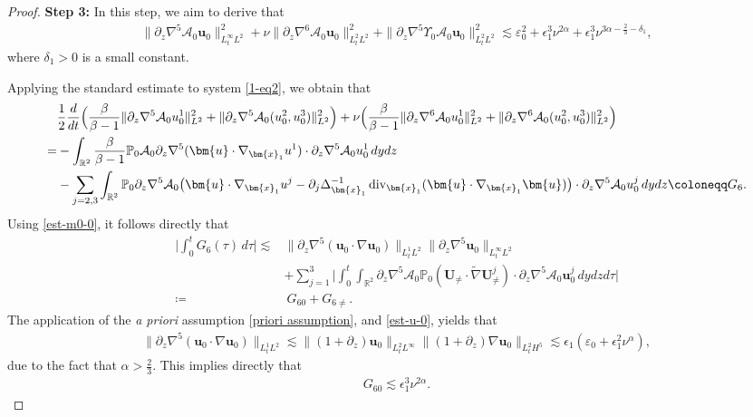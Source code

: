 \documentclass[11pt,reqno]{article}
\numberwithin{equation}{section}
\newcommand\R{{\mathbb R}}
\newcommand\PP{{\mathbb P}}
\newcommand\A{\mathcal{A}}
\newcommand\x{\bm{x}}
\newcommand\uu{\bm{u}}
\newcommand\U{\bm{U}}
\newcommand \tri {\coloneqq}
\let\pa=\partial
\let\na=\nabla
\let\al=\alpha
\let\var=\varepsilon
\let\f=\frac
\let\ep=\epsilon
\def\dive{\mathop{\rm div}\nolimits}
\begin{document}
\begin{proof}
\medskip
\noindent
\textbf{Step 3:} In this step, we aim to derive that
\begin{align}\label{est-step2}
      \|\pa_z\nabla^5\A_0\uu_0\|_{L^\infty_tL^{2}}^2
        +\nu \|\pa_z\nabla^6\A_0\uu_0\|_{L^2_tL^{2}}^2
        +\|\pa_z\nabla^5\varUpsilon_0\A_0\uu_0\|_{L^2_tL^{2}}^2
        \lesssim \var_0^2+\ep_1^3\nu^{2\al}+\ep_1^3\nu^{3\al-\f23-\delta_1},
\end{align}
where $\delta_1>0$ is a small constant.


Applying the standard estimate to system \eqref{1-eq2}, we obtain that
\begin{align}
	&\f12\f{d}{dt}
	\Big(
	\f{\beta}{\beta-1}\|\pa_z\nabla^5\A_0u_0^1\|_{L^2}^2
    +\|\pa_z\nabla^5\A_0(u_0^2,u_0^3)\|_{L^2}^2
	\Big)
	+
	\nu\Big(\f{\beta}{\beta-1}\|\pa_z\nabla^{6}\A_0u_0^1\|_{L^2}^2
    +\|\pa_z\nabla^{6}\A_0(u_0^2,u_0^3)\|_{L^2}^2
	\Big)
	\nonumber\\
	=&-\int_{\R^2}	\f{\beta}{\beta-1}\PP_0\A_0\pa_z\nabla^5(\uu\cdot\nabla_{\x_1} u^1)\cdot \pa_z\nabla^5\A_0u_0^1\,dydz
    \nonumber\\
    &
    -\sum_{j=2,3}\int_{\R^2}\PP_0\pa_z\nabla^5\A_0\big(\uu\cdot\nabla_{\x_1} u^j-\pa_j \Delta_{\x_1}^{-1}\dive_{\x_1}(\uu\cdot\nabla_{\x_1} \uu)\big)\cdot \pa_z\nabla^5\A_0 u_0^j \,dydz
	\tri  G_6.
	\label{energy-0-3}
\end{align}
Using \eqref{est-m0-0}, it follows directly that
\begin{align}\label{est-G6}
    \Big|\int_0^t G_6(\tau)\,d\tau\Big|
    \lesssim& \|\pa_z\nabla^5(\uu_0\cdot\nabla\uu_0)\|_{L^1_tL^2}
    \|\pa_z\nabla^5 \uu_0\|_{L^\infty_tL^2}
    \nonumber
    \\
    &+\sum_{j=1}^3\Big|\int_0^t \int_{\R^2}
    \pa_z\nabla^5\A_0\PP_0(\U_{\not=}\cdot\widetilde{\nabla}\U_{\not=}^j)\cdot \pa_z\nabla^5 \A_0 \uu_0^j \,dydzd\tau \Big|
    \nonumber
    \\
    \tri&~ G_{60}+G_{6\not=}.
\end{align}
The application of the \textit{a priori} assumption \eqref{priori assumption}, and \eqref{est-u-0}, yields that
\begin{align*}
    \| \pa_z\nabla^5(\uu_{0}\cdot\nabla\uu_{0})\|_{L^1_tL^2}
    \lesssim 
    \|(1+\pa_z)\uu_{0}\|_{L^2_tL^\infty}\|(1+\pa_z)\na\uu_{0}\|_{L^2_tH^5}
    \lesssim 
    \ep_1(\var_0+\ep_1^2\nu^{\al}),
\end{align*}
due to the fact that $\alpha>\f23$.
This implies directly that
\begin{align*}
    G_{60}
    \lesssim \ep_1^3\nu^{2\al}.

\end{align*}
\end{proof}
\end{document}
